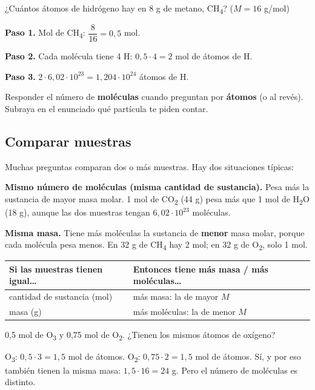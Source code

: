 \begin{ejemplo} ¿Cuántos átomos de hidrógeno hay en 8 g de metano, CH\textsubscript{4}? ($M = 16$ g/mol)\par \textbf{Paso 1.} Mol de CH\textsubscript{4}: $\dfrac{8}{16} = 0{,}5$ mol.\par \textbf{Paso 2.} Cada molécula tiene 4 H: $0{,}5\cdot 4 = 2$ mol de átomos de H.\par \textbf{Paso 3.} $2\cdot 6{,}02\cdot 10^{23} = 1{,}204\cdot 10^{24}$ átomos de H.\end{ejemplo}
 
\begin{ojo} Responder el número de \textbf{moléculas} cuando preguntan por \textbf{átomos} (o al revés). Subraya en el enunciado qué partícula te piden contar.\end{ojo}
\subsection{Comparar muestras}
Muchas preguntas comparan dos o más muestras. Hay dos situaciones típicas:

 

\textbf{Mismo número de moléculas (misma cantidad de sustancia).} Pesa más la sustancia de mayor masa molar. 1 mol de CO\textsubscript{2} (44 g) pesa más que 1 mol de H\textsubscript{2}O (18 g), aunque las dos muestras tengan $6{,}02\cdot 10^{23}$ moléculas.

 

\textbf{Misma masa.} Tiene más moléculas la sustancia de \textbf{menor} masa molar, porque cada molécula pesa menos. En 32 g de CH\textsubscript{4} hay 2 mol; en 32 g de O\textsubscript{2}, solo 1 mol.

 
\begin{center}\small
\begin{tabularx}{\linewidth}{@{}>{\raggedright\arraybackslash\hsize=0.84\hsize}X>{\raggedright\arraybackslash\hsize=1.16\hsize}X@{}}
\toprule
\textbf{Si las muestras tienen igual\dots{}} & \textbf{Entonces tiene más masa / más moléculas\dots{}} \\
\midrule
cantidad de sustancia (mol) & más masa: la de mayor $M$ \\
masa (g) & más moléculas: la de menor $M$ \\
\bottomrule
\end{tabularx}
\end{center}
  
\begin{ejemplo} 0,5 mol de O\textsubscript{3} y 0,75 mol de O\textsubscript{2}. ¿Tienen los mismos átomos de oxígeno?\par O\textsubscript{3}: $0{,}5\cdot 3 = 1{,}5$ mol de átomos. O\textsubscript{2}: $0{,}75\cdot 2 = 1{,}5$ mol de átomos. Sí, y por eso también tienen la misma masa: $1{,}5\cdot 16 = 24$ g. Pero el número de moléculas es distinto.\end{ejemplo}
 
